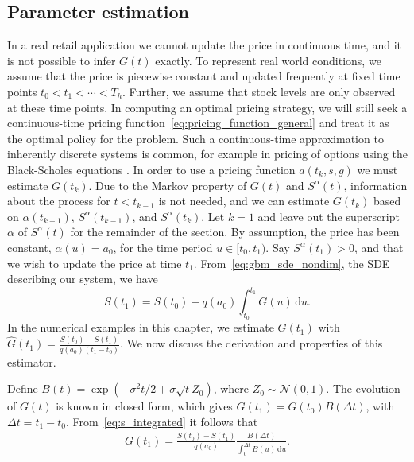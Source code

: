 \documentclass[main.tex]{subfiles}
\begin{document}
\subsection{Parameter estimation}\label{subsec:param_estim}
In a real retail application we cannot update the price in continuous
time, and it is not possible to infer $G(t)$ exactly.
To represent real world conditions, we assume that
the price is piecewise constant and updated frequently at fixed time points
$t_0<t_1<\cdots<T_h$.
Further, we assume that stock levels are only observed at these time
points. In computing an optimal pricing strategy, we will still
seek a continuous-time pricing
function~\eqref{eq:pricing_function_general} and treat it as
the optimal policy for the problem. Such a continuous-time
approximation to inherently discrete systems is common, for example
in pricing of options using the Black-Scholes equations
\citep{black1973pricing}.
In order to use a pricing function $a(t_k,s,g)$ we must estimate
$G(t_k)$.
Due to the Markov property of $G(t)$ and $S^{\alpha}(t)$, information
about the process for $t<t_{k-1}$ is not needed, and we can estimate
$G(t_k)$ based on $\alpha(t_{k-1})$, $S^\alpha(t_{k-1})$, and $S^\alpha(t_k)$.
Let $k = 1$ and leave out the superscript $\alpha$ of $S^\alpha(t)$ for the
remainder of the section.
By assumption, the price has been constant, $\alpha(u)=a_0$, for the time
period $u\in[t_0,t_1)$. Say $S^\alpha(t_1)>0$, and that we wish to update the price at time
$t_1$.
From~\eqref{eq:gbm_sde_nondim}, the SDE describing our system, we have
\begin{equation}\label{eq:s_integrated}
  S(t_1)=S(t_0)-q(a_0)\int_{t_0}^{t_1}G(u)\,\mathrm{d}u.
\end{equation}
In the numerical examples in this chapter, we estimate $G(t_1)$ with
$\hat G(t_1)=\frac{S(t_0)-S(t_1)}{q(a_0)(t_1-t_0)}$.
We now discuss the derivation and properties of this estimator.

Define $B(t) =  \exp(-\sigma^2 t/2+\sigma\sqrt{t}Z_0)$, where $Z_0\sim
\mathcal{N}(0,1)$. The evolution of $G(t)$ is known in closed form,
which gives
$G(t_1)=G(t_0)B(\Delta t)$, with $\Delta t = t_1-t_0$.
From~\eqref{eq:s_integrated} it follows that
\begin{align}
  G(t_1) = \frac{S(t_0)-S(t_1)}{q(a_0)}\frac{B(\Delta
  t)}{\int_0^{\Delta t}B(u)\,\mathrm{d}u}.
\end{align}
\end{document}
